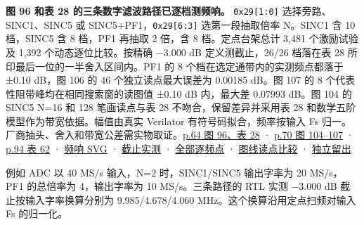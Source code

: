 \documentclass[UTF8,fontset=none,zihao=-4,a4paper]{ctexart}
\newcommand{\TraceCode}[1]{\texttt{\mdseries\upshape #1}}
\begin{document}
\textbf{图 96 和表 28 的三条数字滤波路径已逐档测频响。} \TraceCode{0x29[\relax{}1:\penalty150\relax{}0]\penalty150\relax{}} 选择旁路、\allowbreak{}SINC1、\allowbreak{}SINC5 或 SINC5+\relax{}PF1，\TraceCode{0x29[\penalty150\relax{}6:\penalty150\relax{}3]\penalty150\relax{}} 选第一段抽取倍率 N。SINC1 含 10 档，SINC5 含 8 档，PF1 再抽取 2 倍，含 8 档。定点台架总计 3,481 个激励试验及 1,392 个动态逐位比较。按精确 −3.000 dB 定义测截止，26/26 档落在表 28 所印最后一位的一半舍入区间内。PF1 的 8 个档在选定通带内的实测频点都落于 ±0.10 dB，图 106 的 46 个独立读点最大误差为 0.00185 dB。图 107 的 8 个代表性阻带峰均在相同搜索窗的读图值 ±0.10 dB 内，最大差 0.07993 dB。图 104 的 SINC5 N=16 和 128 笔画读点与表 28 不吻合，保留差异并采用表 28 和数学五阶模型作为带宽依据。幅值由真实 Verilator 有符号码拟合，频率按输入 Fs 归一。厂商抽头、\allowbreak{}舍入和带宽公差需实物取证。\href{https://www.analog.com/media/en/technical-documentation/data-sheets/ad4080.pdf\#page=64}{p.64 图 96、\allowbreak{}表 28} · \href{https://www.analog.com/media/en/technical-documentation/data-sheets/ad4080.pdf\#page=70}{p.70 图 104–107} · \href{https://www.analog.com/media/en/technical-documentation/data-sheets/ad4080.pdf\#page=94}{p.94 表 62} · \href{https://github.com/defineiocc02/20bit\_SAR\_ADC\_Behaviour\_Verification/blob/feat/ad4080-peripherals/rtl/ad4080\_periph/figures/filter-response.svg}{频响 SVG} · \href{https://github.com/defineiocc02/20bit\_SAR\_ADC\_Behaviour\_Verification/blob/feat/ad4080-peripherals/rtl/ad4080\_periph/interfaces/dsp\_review/evidence/filter\_summary.csv}{截止实测} · \href{https://github.com/defineiocc02/20bit\_SAR\_ADC\_Behaviour\_Verification/blob/feat/ad4080-peripherals/rtl/ad4080\_periph/interfaces/dsp\_review/evidence/filter\_response.csv}{全部逐频点} · \href{https://github.com/defineiocc02/20bit\_SAR\_ADC\_Behaviour\_Verification/blob/feat/ad4080-peripherals/rtl/ad4080\_periph/interfaces/dsp\_review/evidence/figure\_comparison.csv}{图线读点比较} · \href{https://github.com/defineiocc02/20bit\_SAR\_ADC\_Behaviour\_Verification/blob/feat/ad4080-peripherals/rtl/ad4080\_periph/interfaces/dsp\_review/evidence/fig106\_holdout.csv}{独立留出}\par

例如 ADC 以 40 MS/s 输入，N=2 时，SINC1/\relax{}SINC5 输出字率为 20 MS/s，PF1 的总倍率为 4，输出字率为 10 MS/s。三条路径的 RTL 实测 −3.000 dB 截止按输入字率换算分别为 9.\relax{}985/\relax{}4.\relax{}678/\relax{}4.\relax{}060 MHz。这个换算沿用定点扫频对输入 Fs 的归一化。\par
\end{document}
